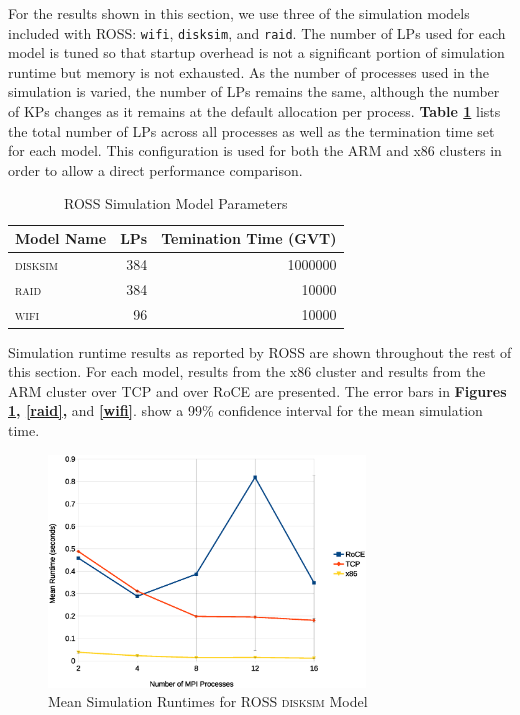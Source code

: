 \documentclass[11pt]{book}
\begin{document}
For the results shown in this section, we use three of the simulation models
included with ROSS: \verb;wifi;, \verb;disksim;, and \verb;raid;. The number of
LPs used for each model is tuned so that startup overhead is not a significant
portion of simulation runtime but memory is not exhausted. As the number of
processes used in the simulation is varied, the number of LPs remains the same,
although the number of KPs changes as it remains at the default allocation per
process. \textbf{Table \ref{lptable}} lists the total number of LPs across all
processes as well as the termination time set for each model. This configuration
is used for both the ARM and x86 clusters in order to allow a direct performance
comparison.

\begin{table}
  \caption{ROSS Simulation Model Parameters}
  \label{lptable}
  \centering
  \begin{tabular}[c]{| l | r | r |}
    \hline
    Model Name & LPs & Temination Time (GVT) \\ \hline
    \textsc{disksim} & 384 & 1000000 \\
    \textsc{raid} & 384 & 10000 \\
    \textsc{wifi} & 96 & 10000 \\
    \hline
  \end{tabular}
\end{table}

Simulation runtime results as reported by ROSS are shown throughout the rest of
this section. For each model, results from the x86 cluster and results from the
ARM cluster over TCP and over RoCE are presented. The error bars in
\textbf{Figures \ref{disksim}, \ref{raid},} and
\textbf{\ref{wifi}}. show a 99\% confidence interval for the mean simulation
time.

\begin{figure}
\centering
\includegraphics[width=0.75\textwidth]{disksim}
\caption{Mean Simulation Runtimes for ROSS \textsc{disksim} Model}
\label{disksim}
\end{figure}
\end{document}
